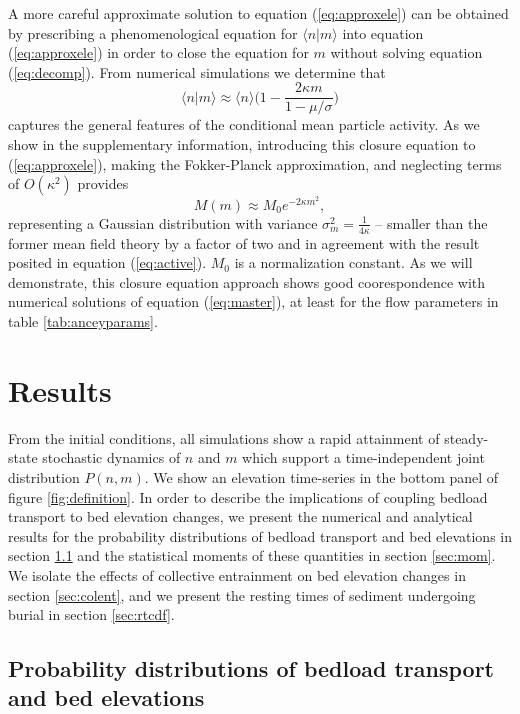 \documentclass[draft]{agujournal2018}
\begin{document}
A more careful approximate solution to equation (\ref{eq:approxele}) can be obtained by prescribing a phenomenological equation for $\langle n | m \rangle$ into equation (\ref{eq:approxele}) in order to close the equation for $m$ without solving equation (\ref{eq:decomp}).
From numerical simulations we determine that
\begin{equation}
\langle n | m  \rangle \approx \langle n \rangle \Big( 1 - \frac{2\kappa m}{1-\mu/\sigma}\Big) \label{eq:closure}
\end{equation}
 captures the general features of the conditional mean particle activity.
As we show in the supplementary information, introducing this closure equation to (\ref{eq:approxele}), making the Fokker-Planck approximation, and neglecting terms of $O(\kappa^2)$ provides 
\begin{equation} M(m) \approx M_0 e^{-2\kappa m^2}, \label{eq:ou2}\end{equation}
representing a Gaussian distribution with variance $\sigma_m^2 = \frac{1}{4\kappa}$ -- smaller than the former mean field theory by a factor of two and in agreement with the result posited in equation (\ref{eq:active}).
$M_0$ is a normalization constant. 
As we will demonstrate, this closure equation approach shows good coorespondence with numerical solutions of equation (\ref{eq:master}), at least for the flow parameters in table \ref{tab:anceyparams}.

\section{Results}
\label{sec:results}

From the initial conditions, all simulations show a rapid attainment of steady-state stochastic dynamics of $n$ and $m$ which support a time-independent joint distribution $P(n,m)$. We show an elevation time-series in the bottom panel of figure \ref{fig:definition}. In order to describe the implications of coupling bedload transport to bed elevation changes, we present the numerical and analytical results for the probability distributions of bedload transport and bed elevations in section \ref{sec:pdf} and the statistical moments of these quantities in section \ref{sec:mom}. We isolate the effects of collective entrainment on bed elevation changes in section \ref{sec:colent}, and we present the resting times of sediment undergoing burial in section \ref{sec:rtcdf}.

\subsection{Probability distributions of bedload transport and bed elevations}
\label{sec:pdf}
\end{document}
